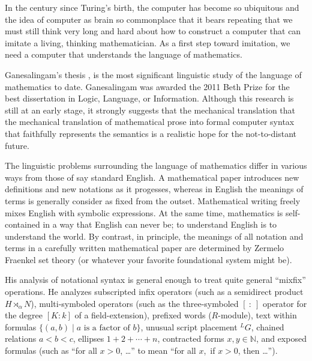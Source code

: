 \documentclass{llncs}
\newcommand{\ring}[1]{\mathbb{#1}}
\begin{document}
In the century since Turing's birth, the computer has become so
ubiquitous and the idea of computer as brain so commonplace that it
bears repeating that we must still think very long and hard about how
to construct a computer that can imitate a living, thinking
mathematician.  As a first step toward imitation, we need a computer
that understands the language of mathematics.


\bigskip

Ganesalingam's thesis \cite{Gan09}, \cite{Gan10} is the most
significant linguistic study of the language of mathematics to date.
Ganesalingam was awarded the 2011 Beth Prize for the best dissertation
in Logic, Language, or Information.  Although this research is still
at an early stage, it strongly suggests that the mechanical
translation that the mechanical translation of mathematical prose into
formal computer syntax that faithfully represents the semantics is a
realistic hope for the not-to-distant future.



The linguistic problems surrounding the language of mathematics differ
in various ways  from those of say standard English.  A
mathematical paper introduces new definitions and new notations as it
progesses, whereas in English the meanings of terms is generally
consider as fixed from the outset.  Mathematical writing freely mixes
English with symbolic expressions.  At the same time, mathematics is
self-contained in a way that English can never be; to understand
English is to understand the world.  By contrast, in principle, the
meanings of all notation and terms in a carefully written mathematical
paper are determined by Zermelo Fraenkel set theory (or whatever your
favorite foundational system might be).

His analysis of notational syntax is general enough to treat quite
general ``mixfix'' operations.  He analyzes subscripted infix
operators (such as a semidirect product $H\rtimes_\alpha N$),
multi-symboled operators (such as the three-symboled $[~:~]$ operator
for the degree $[K:k]$ of a field-extension), prefixed words
($R$-module), text within formulas $\{(a,b) \mid a \text{~is a factor
  of~} b\}$, unusual script placement ${}^LG$, chained relations
$a<b<c$, ellipses $1+2+\cdots+n$, contracted forms $x,y\in\ring{N}$,
and exposed formulas (such as ``for all $x>0$, \dots'' to mean ``for
all $x$,~if $x>0$, then \dots'').
\end{document}
